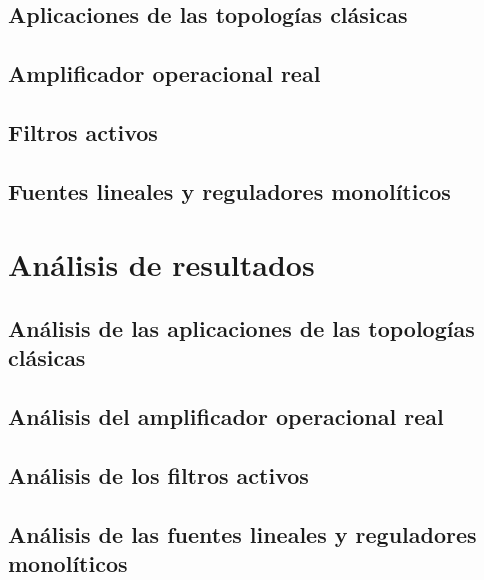 \documentclass{article}
\begin{document}
\subsection{Aplicaciones de las topologías clásicas}

\FloatBarrier
\subsection{Amplificador operacional real}

\FloatBarrier
\subsection{Filtros activos}

\FloatBarrier
\subsection{Fuentes lineales y reguladores monolíticos}


\section{Análisis de resultados}
\subsection{Análisis de las aplicaciones de las topologías clásicas}

\FloatBarrier
\subsection{Análisis del amplificador operacional real}

\FloatBarrier
\subsection{Análisis de los filtros activos}

\FloatBarrier
\subsection{Análisis de las fuentes lineales y reguladores monolíticos}



\end{document}
